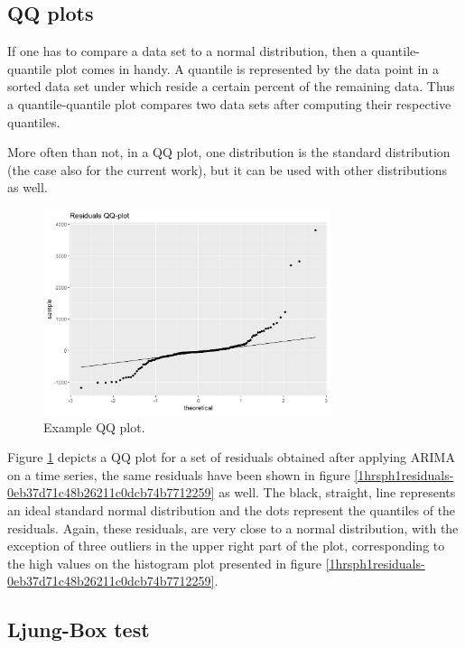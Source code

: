 \documentclass[12pt,a4paper,titlepage]{report}
\begin{document}
\subsection{QQ plots}

If one has to compare a data set to a normal distribution, then a quantile-quantile plot comes in handy. A quantile is represented by the data point in a sorted data set under which reside a certain percent of the remaining data. Thus a quantile-quantile plot compares two data sets after computing their respective quantiles.

More often than not, in a QQ plot, one distribution is the standard distribution (the case also for the current work), but it can be used with other distributions as well. \cite{qqplots}

\begin{figure}[h]
    \centering
    \includegraphics[width=0.75\textwidth]{d1hrsph1residualsqq-0eb37d71c48b26211c0dcb74b7712259}
    \caption{Example QQ plot.}
    \label{1hrsph1residualsqq-0eb37d71c48b26211c0dcb74b7712259}
\end{figure}

Figure \ref{1hrsph1residualsqq-0eb37d71c48b26211c0dcb74b7712259} depicts a QQ plot for a set of residuals obtained after applying ARIMA on a time series, the same residuals have been shown in figure \ref{1hrsph1residuals-0eb37d71c48b26211c0dcb74b7712259} as well. The black, straight, line represents an ideal standard normal distribution and the dots represent the quantiles of the residuals. Again, these residuals, are very close to a normal distribution, with the exception of three outliers in the upper right part of the plot, corresponding to the high values on the histogram plot presented in figure \ref{1hrsph1residuals-0eb37d71c48b26211c0dcb74b7712259}.

\subsection{Ljung-Box test}
\end{document}
